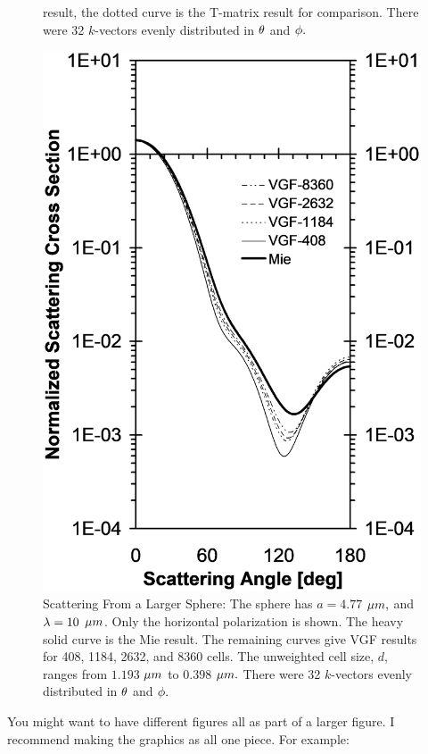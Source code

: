 \begin{figure}[!htb]
\begin{minipage}{.5\textwidth}
{			result, the dotted curve is the T-matrix result for comparison. 
			There were 32 $k$-vectors evenly distributed in $\protect\theta$ 
			and $\protect\phi.$
		    }
	\end{minipage}%
	\begin{minipage}{0.5\textwidth}
		\centering
		\includegraphics[width=0.9\linewidth, height=0.35\textheight]{test70}
		\caption{Scattering From a Larger Sphere: The sphere has $a=4.77$ $\protect\mu m,$ and $\protect\lambda =10$ $\protect\mu m$. Only the horizontal polarization is shown. The heavy solid curve is the Mie result. The remaining curves give VGF results for 408, 1184, 2632, and 8360 cells. \thinspace The unweighted cell size, $d$, ranges from $1.193$ $\protect\mu m$ to $0.398$ $\protect\mu m.$ There were 32 $k$-vectors evenly distributed in $\protect\theta $ and $\protect\phi.$ \vspace{0.8in}}
		\label{fig:bigsphere}
	\end{minipage}
\end{figure}
You might want to have different figures all as part of a larger figure. I recommend making the graphics as all one piece.  For example:


